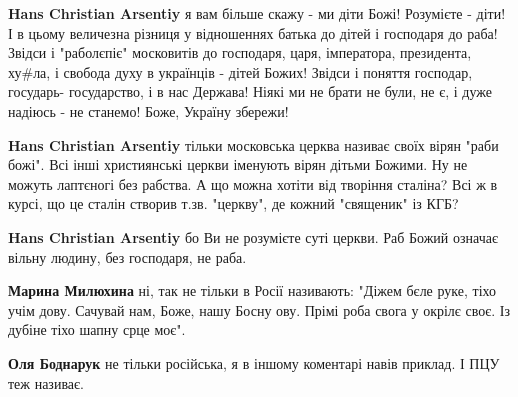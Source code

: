 \begin{itemize}
\begin{itemize}
\textbf{Hans Christian Arsentiy} я вам більше скажу - ми діти Божі! Розумієте - діти! І в цьому величезна різниця у відношеннях батька до дітей і господаря до раба! Звідси і "раболєпіє" московитів до господаря, царя, імператора, президента, ху\#ла, і свобода духу в українців - дітей Божих! Звідси і поняття господар, государь- государство, і в нас Держава! Ніякі ми не брати не були, не є, і дуже надіюсь - не станемо! Боже, Україну збережи!

 
\textbf{Hans Christian Arsentiy} тільки московська церква називає своїх вірян "раби божі". Всі інші християнські церкви іменують вірян дітьми Божими. Ну не можуть лаптєногі без рабства. А що можна хотіти від творіння сталіна? Всі ж в курсі, що це сталін створив т.зв. "церкву", де кожний "священик" із КГБ?

 
\textbf{Hans Christian Arsentiy} бо Ви не розумієте суті церкви. Раб Божий означає вільну людину, без господаря, не раба.

 
\textbf{Марина Милюхина} ні, так не тільки в Росії називають: "Діжем бєле руке, тіхо учім дову. Сачувай нам, Боже, нашу Босну ову. Прімі роба свога у окрілє своє. Із дубіне тіхо шапну срце моє".

 
\textbf{Оля Боднарук} не тільки російська, я в іншому коментарі навів приклад. І ПЦУ теж називає.
\end{itemize}


\end{itemize}
